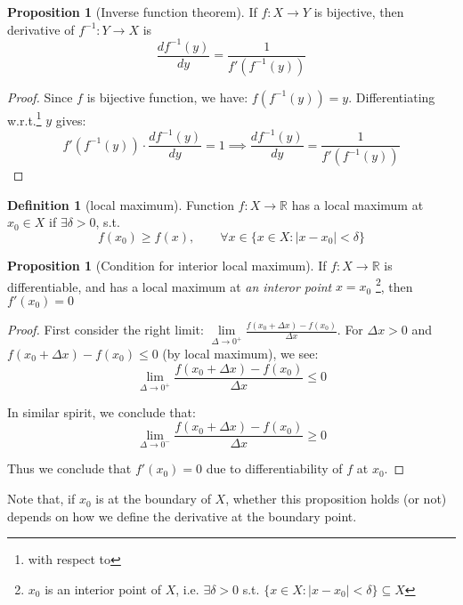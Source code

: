 \documentclass[12pt]{article}
\newcommand{\R}{{\mathbb R}}
\theoremstyle{definition}
\newtheorem{definition}[theorem]{Definition}
\newtheorem{proposition}[theorem]{Proposition}
\theoremstyle{plain}
\begin{document}
\begin{proposition}
    [Inverse function theorem]
    If $f: X \to Y$ is bijective, then derivative of $f^{-1}: Y \to X$ is 
    \[
        \frac{d f^{-1}(y)}{dy } = \frac{1}{f'(f^{-1}(y))}
    \]
    \begin{proof}
        Since $f$ is bijective function, we have: 
        $f(f^{-1}(y)) = y$. Differentiating w.r.t.\footnote{with respect 
        to} $y$ gives: 
        \[
            f'(f^{-1} (y)) \cdot \frac{d f^{-1}(y)}{dy } = 1
            \implies 
            \frac{d f^{-1}(y)}{dy } = \frac{1}{f'(f^{-1}(y))}
        \]
    \end{proof}
\end{proposition}

\begin{definition}
    [local maximum]
    Function $f: X \to \R$ has a local maximum at $x_0 \in X$ if $\exists \delta 
    > 0$, s.t. 
    \[
        f(x_0) \ge f(x), \qquad \forall x \in \{ x \in X: |x - x_0| < \delta\}
    \]
\end{definition}

\begin{proposition}
    [Condition for interior local maximum]
    If $f: X \to \R$ is differentiable, and has a local maximum at 
    \textit{an interor point} $x = x_0$ 
    \footnote{$x_0$ is an interior point of $X$, i.e. $\exists \delta > 0$ s.t. $\{x \in 
    X: |x - x_0| < \delta\} \subseteq X$}, then $f'(x_0) = 0$

    \begin{proof}
        First consider the right limit: 
        $
        \underset{\Delta \to 0^+} \lim \frac{f(x_0+\Delta x) - f(x_0)}{\Delta x}
        $. For $\Delta x > 0$ and $f(x_0+\Delta x) -f (x_0) \le 0$ (by local 
        maximum), we see: 
        \[
        \underset{\Delta \to 0^+} \lim \frac{f(x_0+\Delta x) - f(x_0)}{\Delta x} \le 0
        \]

        In similar spirit, we conclude that: 
        \[
        \underset{\Delta \to 0^-} \lim \frac{f(x_0+\Delta x) - f(x_0)}{\Delta x} \ge 0
        \]

        Thus we conclude that $f'(x_0) = 0$ due to differentiability of $f$ at 
        $x_0$.

    \end{proof}

    Note that, if $x_0$ is at the boundary of $X$, whether this proposition 
    holds (or not) depends on how we define the derivative at the boundary point.
\end{proposition}
\end{document}
